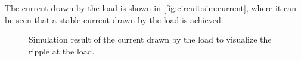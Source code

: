 \documentclass[../report.tex]{subfiles}
\begin{document}
The current drawn by the load is shown in \autoref{fig:circuit:sim:current}, where it can be seen that a stable current drawn by the load is achieved.

\begin{figure}[H]
    \centering
    \noindent{}
    \caption{Simulation result of the current drawn by the load to visualize the ripple at the load.}
    \label{fig:circuit:sim:current}
\end{figure}
\end{document}
